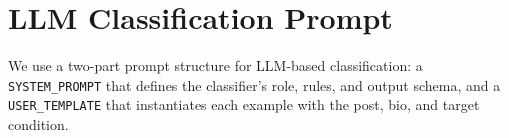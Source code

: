 \documentclass[11pt]{article}
\begin{document}




\section{LLM Classification Prompt}
\label{app:prompt}

We use a two-part prompt structure for LLM-based classification: a \texttt{SYSTEM\_PROMPT} that defines the classifier's role, rules, and output schema, and a \texttt{USER\_TEMPLATE} that instantiates each example with the post, bio, and target condition.
\end{document}
